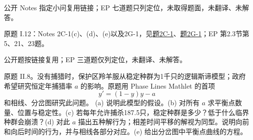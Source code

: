 \begin{solution}公开 Notes 指定小问复用链接；EP 七道题只列定位，未取得题面，未翻译、未解答。\end{solution}
\begin{exercise}\label{cw:ps3-I-12}原题 I.12：Notes 2C-1(c)、(d)、(e)以及2G-1，见\hyperref[cw:bank-2C-1]{题2C-1}、\hyperref[cw:bank-2G-1]{题2G-1}；EP 第2.3节第5、21、23题。\end{exercise}
\begin{solution}公开题按链接复用；EP 三道题仅列定位，未翻译、未解答。\end{solution}
\begin{exercise}\label{cw:ps3-II-8}
原题 II.8。没有捕猎时，保护区羚羊服从稳定种群为1千只的逻辑斯谛模型；政府希望研究恒定年捕猎率 $a$ 的影响。原题用 Phase Lines Mathlet 的首项
\[
 y'=(1-y)y-a
\]
和相线、分岔图研究此问题。
(a) 说明此模型的假设。(b) 对所有 $a$ 求平衡点数量、位置与稳定性。(c) 若每年允许捕杀187.5只，稳定种群是多少？低于什么临界种群会崩溃？(d) 对此 $a$ 描出五种解行为；相差时间平移的解视为同型。说明向前和向后时间的行为，并与相线各部分对应。(e) 给出分岔图中平衡点曲线的方程。
\end{exercise}
